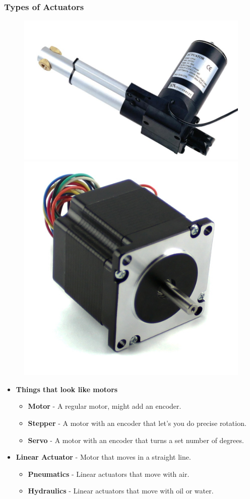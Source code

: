 \documentclass[compress]{beamer}
\begin{document}
\begin{frame}
  \frametitle{Types of Actuators}
  \begin{figure}
     \includegraphics[width=0.2\linewidth]{linear.jpg}
     \quad
     \includegraphics[width=0.2\linewidth]{stepper.jpg}
  \end{figure}
   \begin{itemize}
   \item \textbf{Things that look like motors} 
     \begin{itemize}
     \item \textbf{Motor} - A regular motor, might add an encoder.
     \item \textbf{Stepper} - A motor with an encoder that let's you do precise rotation.
     \item \textbf{Servo} - A motor with an encoder that turns a set number of degrees.
     \end{itemize}
   \item \textbf{Linear Actuator} - Motor that moves in a straight line. 
     \begin{itemize}
     \item \textbf{Pneumatics} - Linear actuators that move with air.
     \item \textbf{Hydraulics} - Linear actuators that move with oil or water.
     \end{itemize}     
   \end{itemize}     
 \end{frame}
\end{document}
